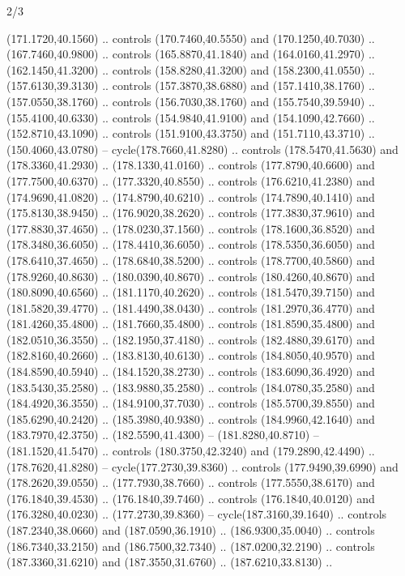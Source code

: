 \begin{flagdescription}{2/3}
\begin{scope}[xshift=0.5\flaglength,yshift=0.5\flagwidth,scale=\stretchfactor]
\begin{scope}[scale=0.001645\flagwidth,yshift=65mm,xshift=-63mm]
\begin{scope}[y=0.80pt, x=0.80pt, yscale=-1,]
\begin{scope}[cm={{1.33333,0.0,0.0,1.33333,(0.0,1e-05)}}]
  (171.1720,40.1560) .. controls (170.7460,40.5550) and (170.1250,40.7030) ..
  (167.7460,40.9800) .. controls (165.8870,41.1840) and (164.0160,41.2970) ..
  (162.1450,41.3200) .. controls (158.8280,41.3200) and (158.2300,41.0550) ..
  (157.6130,39.3130) .. controls (157.3870,38.6880) and (157.1410,38.1760) ..
  (157.0550,38.1760) .. controls (156.7030,38.1760) and (155.7540,39.5940) ..
  (155.4100,40.6330) .. controls (154.9840,41.9100) and (154.1090,42.7660) ..
  (152.8710,43.1090) .. controls (151.9100,43.3750) and (151.7110,43.3710) ..
  (150.4060,43.0780) -- cycle(178.7660,41.8280) .. controls (178.5470,41.5630)
  and (178.3360,41.2930) .. (178.1330,41.0160) .. controls (177.8790,40.6600)
  and (177.7500,40.6370) .. (177.3320,40.8550) .. controls (176.6210,41.2380)
  and (174.9690,41.0820) .. (174.8790,40.6210) .. controls (174.7890,40.1410)
  and (175.8130,38.9450) .. (176.9020,38.2620) .. controls (177.3830,37.9610)
  and (177.8830,37.4650) .. (178.0230,37.1560) .. controls (178.1600,36.8520)
  and (178.3480,36.6050) .. (178.4410,36.6050) .. controls (178.5350,36.6050)
  and (178.6410,37.4650) .. (178.6840,38.5200) .. controls (178.7700,40.5860)
  and (178.9260,40.8630) .. (180.0390,40.8670) .. controls (180.4260,40.8670)
  and (180.8090,40.6560) .. (181.1170,40.2620) .. controls (181.5470,39.7150)
  and (181.5820,39.4770) .. (181.4490,38.0430) .. controls (181.2970,36.4770)
  and (181.4260,35.4800) .. (181.7660,35.4800) .. controls (181.8590,35.4800)
  and (182.0510,36.3550) .. (182.1950,37.4180) .. controls (182.4880,39.6170)
  and (182.8160,40.2660) .. (183.8130,40.6130) .. controls (184.8050,40.9570)
  and (184.8590,40.5940) .. (184.1520,38.2730) .. controls (183.6090,36.4920)
  and (183.5430,35.2580) .. (183.9880,35.2580) .. controls (184.0780,35.2580)
  and (184.4920,36.3550) .. (184.9100,37.7030) .. controls (185.5700,39.8550)
  and (185.6290,40.2420) .. (185.3980,40.9380) .. controls (184.9960,42.1640)
  and (183.7970,42.3750) .. (182.5590,41.4300) -- (181.8280,40.8710) --
  (181.1520,41.5470) .. controls (180.3750,42.3240) and (179.2890,42.4490) ..
  (178.7620,41.8280) -- cycle(177.2730,39.8360) .. controls (177.9490,39.6990)
  and (178.2620,39.0550) .. (177.7930,38.7660) .. controls (177.5550,38.6170)
  and (176.1840,39.4530) .. (176.1840,39.7460) .. controls (176.1840,40.0120)
  and (176.3280,40.0230) .. (177.2730,39.8360) -- cycle(187.3160,39.1640) ..
  controls (187.2340,38.0660) and (187.0590,36.1910) .. (186.9300,35.0040) ..
  controls (186.7340,33.2150) and (186.7500,32.7340) .. (187.0200,32.2190) ..
  controls (187.3360,31.6210) and (187.3550,31.6760) .. (187.6210,33.8130) ..

\end{scope}
\end{scope}
\end{scope}
\end{scope}
\end{flagdescription}
